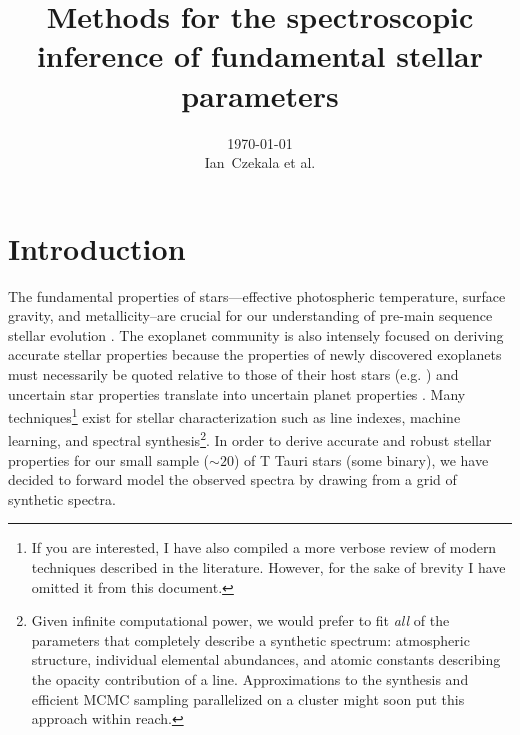 \documentclass[preprint]{aastex} %
\begin{document}
\title{Methods for the spectroscopic inference of fundamental stellar parameters}
\author{\today{}\\
\medskip
Ian~Czekala et al.
}


\section{Introduction}
The fundamental properties of stars---effective photospheric temperature, surface gravity, and metallicity--are crucial for our understanding of pre-main sequence stellar evolution \citep{dm97, bca+02}. The exoplanet community is also intensely focused on deriving accurate stellar properties because the properties of newly discovered exoplanets must necessarily be quoted relative to those of their host stars (e.g. \citealt{tfs+12,blj+12,ssm+13}) and uncertain star properties translate into uncertain planet properties \citep{kan14}. Many techniques\footnote{If you are interested, I have also compiled a more verbose review of modern techniques described in the literature. However, for the sake of brevity I have omitted it from this document.} exist for stellar characterization such as line indexes, machine learning, and spectral synthesis\footnote{Given infinite computational power, we would prefer to fit \emph{all} of the parameters that completely describe a synthetic spectrum: atmospheric structure, individual elemental abundances, and atomic constants describing the opacity contribution of a line. Approximations to the synthesis and efficient MCMC sampling parallelized on a cluster might soon put this approach within reach.}. In order to derive accurate and robust stellar properties for our small sample ($\sim 20$) of T Tauri stars (some binary), we have decided to forward model the observed spectra by drawing from a grid of synthetic spectra.
\end{document}
